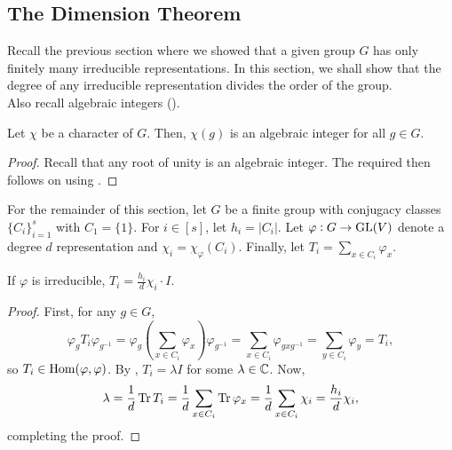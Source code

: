 	\subsection{The Dimension Theorem}

		Recall the previous section where we showed that a given group $G$ has only finitely many irreducible representations. In this section, we shall show that the degree of any irreducible representation divides the order of the group.\\
		Also recall algebraic integers ().

		\begin{fprop}
			\label{prop: character alg int}
			Let $\chi$ be a character of $G$. Then, $\chi(g)$ is an algebraic integer for all $g \in G$.
		\end{fprop}
		\begin{proof}
			Recall that any root of unity is an algebraic integer. The required then follows on using .
		\end{proof}

		For the remainder of this section, let $G$ be a finite group with conjugacy classes $\{C_i\}_{i=1}^s$ with $C_1 = \{1\}$. For $i \in [s]$, let $h_i = |C_i|$. Let $\varphi : G \to \operatorname{GL}(V)$ denote a degree $d$ representation and $\chi_i = \chi_\varphi(C_i)$. Finally, let $T_i = \sum_{x \in C_i} \varphi_x$.

		\begin{flem}
			If $\varphi$ is irreducible, $T_i = \frac{h_i}{d} \chi_i \cdot I$.
		\end{flem}
		\begin{proof}
			First, for any $g \in G$,
			\[ \varphi_g T_i \varphi_{g^{-1}} = \varphi_g \left( \sum_{x \in C_i} \varphi_x \right) \varphi_{g^{-1}} = \sum_{x \in C_i} \varphi_{gxg^{-1}} = \sum_{y \in C_i} \varphi_y = T_i, \]
			so $T_i \in \operatorname{Hom}(\varphi,\varphi)$. By , $T_i = \lambda I$ for some $\lambda \in \mathbb{C}$. Now,
			\[ \lambda = \frac{1}{d} \operatorname{Tr} T_i = \frac{1}{d} \sum_{x \in C_i} \operatorname{Tr} \varphi_x = \frac{1}{d} \sum_{x \in C_i} \chi_i = \frac{h_i}{d} \chi_i, \]
			completing the proof.
		\end{proof}

